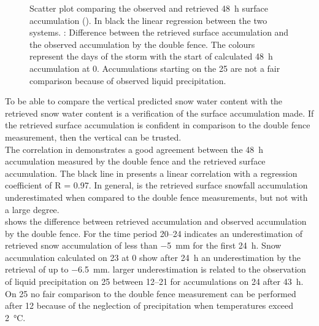 \begin{figure}[t]
	\caption{Scatter plot comparing the observed and retrieved \SI{48}{\hour} surface accumulation (\protect{}).  In black the linear regression between the two systems. \protect{}: Difference between the retrieved surface accumulation and the observed accumulation by the double fence. The colours represent the days of the storm with the start of calculated \SI{48}{\hour} accumulation at \SI{0}{\UTC}. Accumulations starting on the \SI{25}{\dec} are not a fair comparison because of observed liquid precipitation. }\label{fig:res:obs_ret}
\end{figure}
To be able to compare the vertical predicted snow water content with the retrieved snow water content is a verification of the surface accumulation made. If the retrieved surface accumulation is confident in comparison to the double fence measurement, then the vertical can be trusted.
\\
The correlation in  demonstrates a good agreement between the \SI{48}{\hour} accumulation measured by the double fence and the retrieved surface accumulation.
The black line in  presents a linear correlation with a regression coefficient of R = \num{0.97}. 
In general, is the retrieved surface snowfall accumulation underestimated when compared to the double fence measurements, but not with a large degree. 
\\
 shows the difference between retrieved accumulation and observed accumulation by the double fence. For the time period \SIrange{20}{24}{\dec} indicates  an underestimation of retrieved snow accumulation of less than \SI{-5}{\mm} for the first \SI{24}{\hour}. 
Snow accumulation calculated on \SI{23}{\dec} at \SI{0}{\UTC} show after \SI{24}{\hour} an underestimation by the retrieval of up to \SI{-6.5}{\mm}. larger underestimation is related to the observation of liquid precipitation on \SI{25}{\dec} between \SIrange{12}{21}{\UTC} for accumulations on \SI{24}{\dec} after \SI{43}{\hour}. On \SI{25}{\dec} no fair comparison to the double fence measurement can be performed after \SI{12}{\UTC} because of the neglection of precipitation when temperatures exceed \SI{2}{\celsius}.
\\

